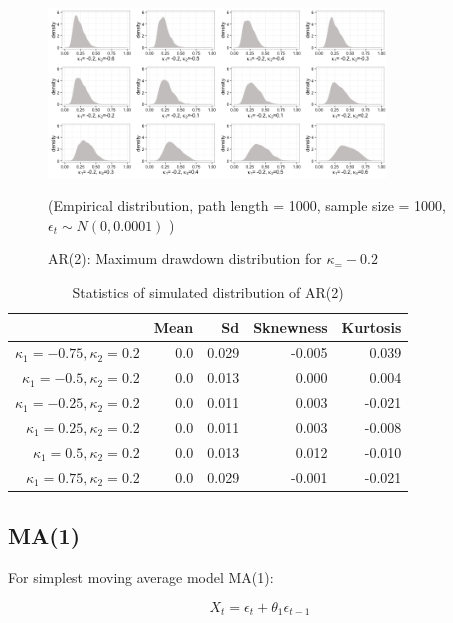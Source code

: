 \documentclass[11pt]{article}
\begin{document}
\begin{figure}[H]
\centering
\includegraphics[width = 0.8\textwidth]{../figures/simulation/AR2_maxDrawdown_dist_kappa1_-02}
\caption{AR(2): Maximum drawdown distribution for $\kappa_ = -0.2$}
(Empirical distribution, path length = 1000, sample size = 1000, $\epsilon_t \sim N(0, 0.0001)$ )
\label{fig:AR2_maxDrawdown_dist_kappa2_-02}
\end{figure}

\begin{table}[H]
\centering
\begin{tabular}{|r |r r r r|}
\hline
& Mean & Sd & Sknewness & Kurtosis \\
\hline
$\kappa_1 = -0.75, \kappa_2 = 0.2$ & 0.0 & 0.029 & -0.005 & 0.039\\
$\kappa_1 = -0.5, \kappa_2 = 0.2$ & 0.0 & 0.013 & 0.000 & 0.004\\
$\kappa_1 = -0.25, \kappa_2 = 0.2$ & 0.0 & 0.011 & 0.003 & -0.021\\
$\kappa_1 = 0.25, \kappa_2 = 0.2$ & 0.0 &  0.011 & 0.003 & -0.008\\
$\kappa_1 = 0.5, \kappa_2 = 0.2$ & 0.0 & 0.013 & 0.012 & -0.010\\
$\kappa_1 = 0.75, \kappa_2 = 0.2$ & 0.0 &  0.029 & -0.001 & -0.021\\
\hline
\end{tabular}
\caption{Statistics of simulated distribution of AR(2)}
\label{table: AR2_return}
\end{table}

\subsection{MA(1)} %

For simplest moving average model MA(1):

\begin{equation}
X_t = \epsilon_t + \theta_1\epsilon_{t-1}
\end{equation}
\end{document}
